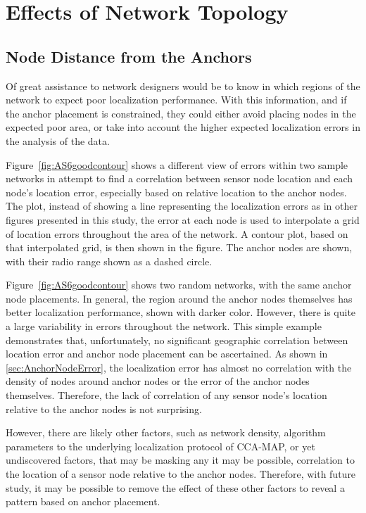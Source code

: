 \chapter{Effects of Network Topology}

\section{Node Distance from the Anchors}

Of great assistance to network designers would be to know in which regions of the network to expect poor localization performance.  With this information, and if the anchor placement is constrained, they could either avoid placing nodes in the expected poor area, or take into account the higher expected localization errors in the analysis of the data.

Figure~\ref{fig:AS6goodcontour} shows a different view of errors within two sample networks in attempt to find a correlation between sensor node location and each node's location error, especially based on relative location to the anchor nodes.  The plot, instead of showing a line representing the localization errors as in other figures presented in this study, the error at each node is used to interpolate a grid of location errors throughout the area of the network.  A contour plot, based on that interpolated grid, is then shown in the figure.  The anchor nodes are shown, with their radio range shown as a dashed circle.  

Figure~\ref{fig:AS6goodcontour} shows two random networks, with the same anchor node placements. In general, the region around the anchor nodes themselves has better localization performance, shown with darker color.  However, there is quite a large variability in errors throughout the network.  This simple example demonstrates that, unfortunately, no significant geographic correlation between location error and anchor node placement can be ascertained.  As shown in \ref{sec:AnchorNodeError}, the localization error has almost no correlation with the density of nodes around anchor nodes or the error of the anchor nodes themselves.  Therefore, the lack of correlation of any sensor node's location relative to the anchor nodes is not surprising.

However, there are likely other factors, such as network density, algorithm parameters to the underlying localization protocol of CCA-MAP, or yet undiscovered factors, that may be masking any it may be possible, correlation to the location of a sensor node relative to the anchor nodes.  Therefore, with future study, it may be possible to remove the effect of these other factors to reveal a pattern based on anchor placement. 

